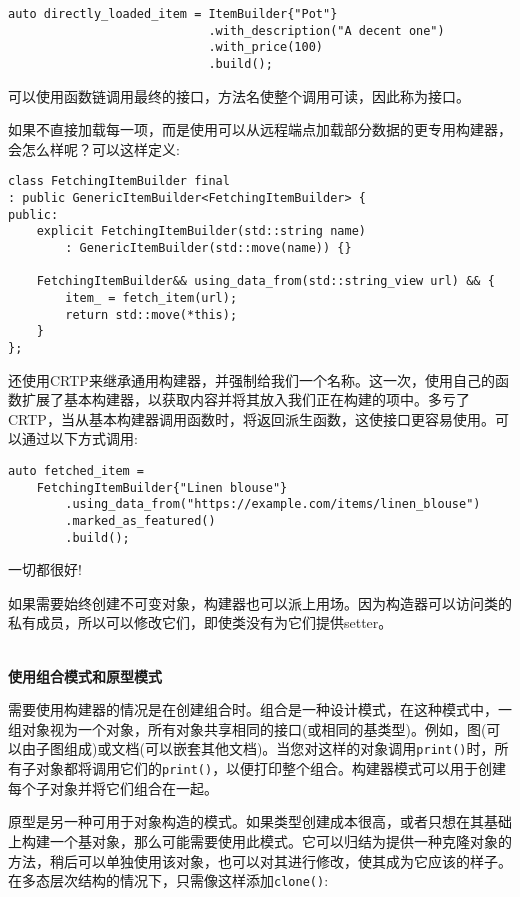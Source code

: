 \begin{lstlisting}[style=styleCXX]
auto directly_loaded_item = ItemBuilder{"Pot"}
							.with_description("A decent one")
							.with_price(100)
							.build();
\end{lstlisting}

可以使用函数链调用最终的接口，方法名使整个调用可读，因此称为接口。

如果不直接加载每一项，而是使用可以从远程端点加载部分数据的更专用构建器，会怎么样呢？可以这样定义:

\begin{lstlisting}[style=styleCXX]
class FetchingItemBuilder final
: public GenericItemBuilder<FetchingItemBuilder> {
public:
	explicit FetchingItemBuilder(std::string name)
		: GenericItemBuilder(std::move(name)) {}
	
	FetchingItemBuilder&& using_data_from(std::string_view url) && {
		item_ = fetch_item(url);
		return std::move(*this);
    }
};
\end{lstlisting}

还使用CRTP来继承通用构建器，并强制给我们一个名称。这一次，使用自己的函数扩展了基本构建器，以获取内容并将其放入我们正在构建的项中。多亏了CRTP，当从基本构建器调用函数时，将返回派生函数，这使接口更容易使用。可以通过以下方式调用:

\begin{lstlisting}[style=styleCXX]
auto fetched_item =
	FetchingItemBuilder{"Linen blouse"}
		.using_data_from("https://example.com/items/linen_blouse")
		.marked_as_featured()
		.build();
\end{lstlisting}

一切都很好!

如果需要始终创建不可变对象，构建器也可以派上用场。因为构造器可以访问类的私有成员，所以可以修改它们，即使类没有为它们提供setter。

\hspace*{\fill} \\ %
\noindent
\textbf{使用组合模式和原型模式}

需要使用构建器的情况是在创建组合时。组合是一种设计模式，在这种模式中，一组对象视为一个对象，所有对象共享相同的接口(或相同的基类型)。例如，图(可以由子图组成)或文档(可以嵌套其他文档)。当您对这样的对象调用\texttt{print()}时，所有子对象都将调用它们的\texttt{print()}，以便打印整个组合。构建器模式可以用于创建每个子对象并将它们组合在一起。

原型是另一种可用于对象构造的模式。如果类型创建成本很高，或者只想在其基础上构建一个基对象，那么可能需要使用此模式。它可以归结为提供一种克隆对象的方法，稍后可以单独使用该对象，也可以对其进行修改，使其成为它应该的样子。在多态层次结构的情况下，只需像这样添加\texttt{clone()}:

